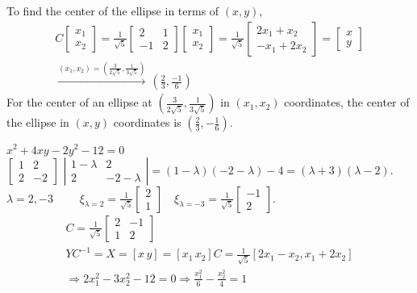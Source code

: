 \documentclass[twoside]{amsart}
\theoremstyle{plain}
\theoremstyle{definition}
\newcommand{\exercisehead}[1]
  {
   \noindent{\small\bf Exercise #1.}
   \smallskip}
\begin{document}
To find the center of the ellipse in terms of $(x,y)$, 
\[
\begin{gathered}
  C \left[ \begin{matrix} x_1 \\ x_2 \end{matrix} \right] = \frac{1}{\sqrt{5}} \left[ \begin{matrix} 2 & 1 \\ -1 & 2 \end{matrix} \right] \left[ \begin{matrix} x_1 \\ x_2 \end{matrix} \right] = \frac{1}{\sqrt{5}} \left[ \begin{matrix} 2x_1 + x_2 \\ -x_1 + 2x_2 \end{matrix} \right] = \left[ \begin{matrix} x \\ y \end{matrix} \right] \\
  \xrightarrow{ (x_1,x_2) = \left( \frac{3}{2\sqrt{5}}, \frac{1}{3\sqrt{5}} \right) } \, \left( \frac{2}{3}, \frac{-1}{6} \right)
\end{gathered}
\]
For the center of an ellipse at $\left( \frac{3}{2\sqrt{5}}, \frac{1}{3\sqrt{5}} \right)$ in $(x_1,x_2)$ coordinates, the center of the ellipse in $(x,y)$ coordinates is $\left( \frac{2}{3}, - \frac{1}{6} \right)$.  


\exercisehead{17} $x^2 + 4xy -2y^2 - 12 =0$  \\
$\left[ \begin{matrix} 1 & 2 \\ 2 & -2 \end{matrix} \right]$  $\left| \begin{matrix} 1 - \lambda & 2 \\ 2 & -2 -\lambda \end{matrix} \right| = (1-\lambda)(-2-\lambda) - 4 = (\lambda+3)(\lambda-2)$.  \medskip \\
$\lambda = 2,-3$  $\quad \quad \xi_{\lambda =2} = \frac{1}{ \sqrt{5}} \left[ \begin{matrix} 2 \\ 1 \end{matrix} \right] \quad \xi_{\lambda =-3} = \frac{1}{ \sqrt{5}} \left[ \begin{matrix} -1 \\ 2 \end{matrix} \right]$.  
\[
\begin{gathered}
  C = \frac{1}{ \sqrt{5}} \left[ \begin{matrix} 2 & -1 \\ 1 & 2 \end{matrix} \right] \\
  YC^{-1} = X = [x \, y ] = [ x_1 \, x_2 ] C = \frac{1}{ \sqrt{5}} [ 2x_1 - x_2 , x_1 + 2x_2 ] \\
  \Longrightarrow 2x_1^2 - 3x_2^2 - 12 = 0 \Longrightarrow \boxed{ \frac{x_1^2}{6} - \frac{x_2^2}{ 4 } = 1 }
\end{gathered}
\]
\end{document}
